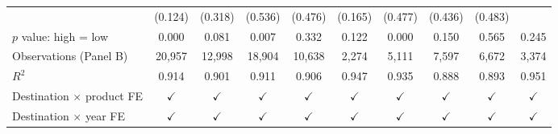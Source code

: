\begin{tabular}{l*{9}{c}}
 & (0.124) & (0.318) & (0.536) & (0.476) & (0.165) & (0.477) & (0.436) & (0.483) &  \\
$p$ value: high = low & 0.000 & 0.081 & 0.007 & 0.332 & 0.122 & 0.000 & 0.150 & 0.565 & 0.245 \\
Observations (Panel B) & 20,957 & 12,998 & 18,904 & 10,638 & 2,274 & 5,111 & 7,597 & 6,672 & 3,374 \\
$R^2$ & 0.914 & 0.901 & 0.911 & 0.906 & 0.947 & 0.935 & 0.888 & 0.893 & 0.951 \\
\midrule
Destination $\times$ product FE & $\checkmark$ & $\checkmark$ & $\checkmark$ & $\checkmark$ & $\checkmark$ & $\checkmark$ & $\checkmark$ & $\checkmark$ & $\checkmark$ \\
Destination $\times$ year FE & $\checkmark$ & $\checkmark$ & $\checkmark$ & $\checkmark$ & $\checkmark$ & $\checkmark$ & $\checkmark$ & $\checkmark$ & $\checkmark$ \\
\bottomrule
\end{tabular}
